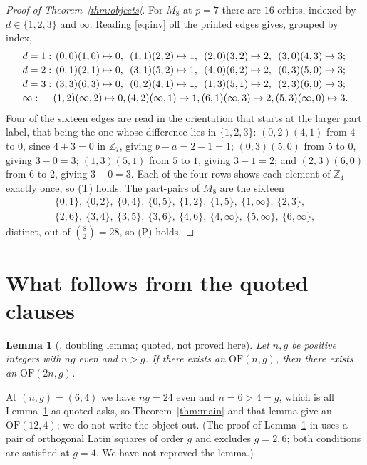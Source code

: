 \documentclass[11pt]{amsart}
\newtheorem{lemma}[theorem]{Lemma}
\theoremstyle{remark}
\newcommand{\OF}{\mathrm{OF}}
\newcommand{\Zp}{\mathbb Z}
\begin{document}
\begin{proof}[Proof of Theorem~\ref{thm:objects}]
For $M_8$ at $p=7$ there are $16$ orbits, indexed by $d\in\{1,2,3\}$ and
$\infty$. Reading \eqref{eq:inv} off the printed edges gives, grouped by
index,
\[
\begin{array}{@{}l@{\,}c@{\,}c@{\,}c@{\,}c@{}}
 d=1: & (0,0)(1,0)\mapsto0, & (1,1)(2,2)\mapsto1,
      & (2,0)(3,2)\mapsto2, & (3,0)(4,3)\mapsto3;\\[2pt]
 d=2: & (0,1)(2,1)\mapsto0, & (3,1)(5,2)\mapsto1,
      & (4,0)(6,2)\mapsto2, & (0,3)(5,0)\mapsto3;\\[2pt]
 d=3: & (3,3)(6,3)\mapsto0, & (0,2)(4,1)\mapsto1,
      & (1,3)(5,1)\mapsto2, & (2,3)(6,0)\mapsto3;\\[2pt]
 \infty: & (1,2)(\infty,2)\mapsto0, & (4,2)(\infty,1)\mapsto1,
      & (6,1)(\infty,3)\mapsto2, & (5,3)(\infty,0)\mapsto3 .
\end{array}
\]
Four of the sixteen edges are read in the orientation that starts at the larger
part label, that being the one whose difference lies in $\{1,2,3\}$:
$(0,2)(4,1)$ from $4$ to $0$, since $4+3=0$ in $\Zp_7$, giving $b-a=2-1=1$;
$(0,3)(5,0)$ from $5$ to $0$, giving $3-0=3$; $(1,3)(5,1)$ from $5$ to $1$,
giving $3-1=2$; and $(2,3)(6,0)$ from $6$ to $2$, giving $3-0=3$. Each of the
four rows shows each element of
$\Zp_4$ exactly once, so (T) holds. The part-pairs of $M_8$ are the sixteen
\[
\begin{gathered}
 \{0,1\},\ \{0,2\},\ \{0,4\},\ \{0,5\},\ \{1,2\},\ \{1,5\},\
 \{1,\infty\},\ \{2,3\},\\
 \{2,6\},\ \{3,4\},\ \{3,5\},\ \{3,6\},\ \{4,6\},\ \{4,\infty\},\
 \{5,\infty\},\ \{6,\infty\},
\end{gathered}
\]
distinct, out of $\binom82=28$, so (P) holds.
\end{proof}

\section{What follows from the quoted clauses}\label{sec:spectrum}

\begin{lemma}[\cite{TZE}, doubling lemma; quoted, not proved here]\label{lem:double}
Let $n,g$ be positive integers with $ng$ even and $n>g$. If there exists an
$\OF(n,g)$, then there exists an $\OF(2n,g)$.
\end{lemma}

At $(n,g)=(6,4)$ we have $ng=24$ even and $n=6>4=g$, which is all
Lemma~\ref{lem:double} as quoted asks, so Theorem~\ref{thm:main} and that lemma
give an $\OF(12,4)$; we do not write the object out. (The proof of
Lemma~\ref{lem:double} in \cite{TZE} uses a pair of orthogonal Latin squares of
order $g$ and excludes $g=2,6$; both conditions are satisfied at $g=4$. We have
not reproved the lemma.)
\end{document}
